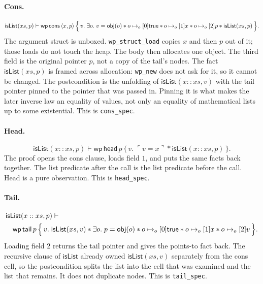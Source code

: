 \documentclass[11pt]{article}
\newcommand{\True}{\mathsf{true}}
\newcommand{\ptso}{\mathrel{\mapsto_{o}}}
\newcommand{\sep}{\mathbin{*}}
\newcommand{\Wpre}{\mathsf{wp}}
\newcommand{\pure}[1]{\ulcorner #1 \urcorner}
\begin{document}
\paragraph{Cons.}
\[
\mathsf{isList}(xs, p)
\vdash
\Wpre\,\mathsf{cons}\,\langle x, p\rangle
\,\Bigl\{\,v.\;
  \exists o.\;
  v = \mathsf{obj}(o)
  \sep
  o \ptso[0] \True
  \sep
  o \ptso[1] x
  \sep
  o \ptso[2] p
  \sep
  \mathsf{isList}(xs, p)
\,\Bigr\}.
\]
The argument struct is unboxed.
\texttt{wp\_struct\_load} copies \(x\) and then \(p\) out of it; those loads do not touch the heap.
The body then allocates one object.
The third field is the original pointer \(p\), not a copy of the tail's nodes.
The fact \(\mathsf{isList}(xs, p)\) is framed across allocation: \texttt{wp\_new} does not ask for it, so it cannot be changed.
The postcondition is the unfolding of \(\mathsf{isList}(x :: xs, v)\) with the tail pointer pinned to the pointer that was passed in.
Pinning it is what makes the later inverse law an equality of values, not only an equality of mathematical lists up to some existential.
This is \texttt{cons\_spec}.

\paragraph{Head.}
\[
\mathsf{isList}(x :: xs, p)
\vdash
\Wpre\,\mathsf{head}\,p
\,\{\,v.\; \pure{v = x} \sep \mathsf{isList}(x :: xs, p)\,\}.
\]
The proof opens the cons clause, loads field \(1\), and puts the same facts back together.
The list predicate after the call is the list predicate before the call.
Head is a pure observation.
This is \texttt{head\_spec}.

\paragraph{Tail.}
\[
\begin{aligned}
&\mathsf{isList}(x :: xs, p) \vdash {}\\
&\quad\Wpre\,\mathsf{tail}\,p
\,\Bigl\{\,v.\;
  \mathsf{isList}(xs, v)
  \sep
  \exists o.\;
  p = \mathsf{obj}(o)
  \sep
  o \ptso[0] \True
  \sep
  o \ptso[1] x
  \sep
  o \ptso[2] v
\,\Bigr\}.
\end{aligned}
\]
Loading field \(2\) returns the tail pointer and gives the points-to fact back.
The recursive clause of \(\mathsf{isList}\) already owned \(\mathsf{isList}(xs, v)\) separately from the cons cell, so the postcondition splits the list into the cell that was examined and the list that remains.
It does not duplicate nodes.
This is \texttt{tail\_spec}.
\end{document}
